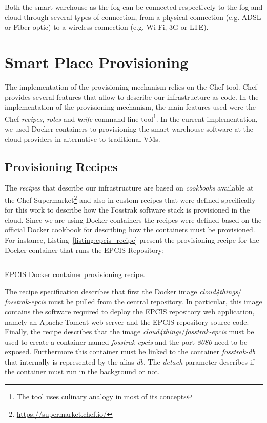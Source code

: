 Both the smart warehouse as the fog can be connected respectively to the fog and cloud through several
types of connection, from a physical connection (e.g. \gls{ADSL} or Fiber-optic) to a wireless connection
(e.g. Wi-Fi, 3G or \gls{LTE}).

\section{Smart Place Provisioning}
\label{sec:impl_provisioning}
The implementation of the provisioning mechanism relies on the Chef tool. Chef provides several features
that allow to describe our infrastructure as code. In the implementation of the provisioning mechanism,
the main features used were the Chef \textit{recipes}, \textit{roles} and \textit{knife} command-line
tool\footnote{The tool uses culinary analogy in most of its concepts}. In the current implementation,
we used Docker containers to provisioning the smart warehouse software at the cloud providers in
alternative to traditional \glspl{VM}.

\subsection{Provisioning Recipes}
\label{sub:recipes}
The \textit{recipes} that describe our infrastructure are based on \textit{cookbooks} available at the
Chef Supermarket\footnote{\url{https://supermarket.chef.io/}} and also in custom recipes that
were defined specifically for this work to describe how the Fosstrak software stack is provisioned
in the cloud. Since we are using Docker containers the recipes were defined based on the official
Docker cookbook for describing how the containers must be provisioned. For instance, Listing~\ref{listing:epcis_recipe}
present the provisioning recipe for the Docker container that runs the \gls{EPCIS} Repository:

\begin{listing}
  \inputminted[frame=lines,
                 framesep=3mm,
                 linenos=true,
                 xleftmargin=21pt,
                 tabsize=4]{ruby}{./listings/epcis_recipe.rb}
  \caption{EPCIS Docker container provisioning recipe.}
  \label{listing:epcis_recipe}
\end{listing}

The recipe specification describes that first the Docker image \textit{cloud4things$/$fosstrak-epcis}
must be pulled from the central repository. In particular, this image contains the software required
to deploy the \gls{EPCIS} repository web application, namely an Apache Tomcat web-server and the \gls{EPCIS}
repository source code. Finally, the recipe describes that the image \textit{cloud4things$/$fosstrak-epcis}
must be used to create a container named \textit{fosstrak-epcis} and the port \textit{8080} need to
be exposed. Furthermore this container must be linked to the container \textit{fosstrak-db} that
internally is represented by the alias \textit{db}. The \textit{detach} parameter describes if the
container must run in the background or not.\\

